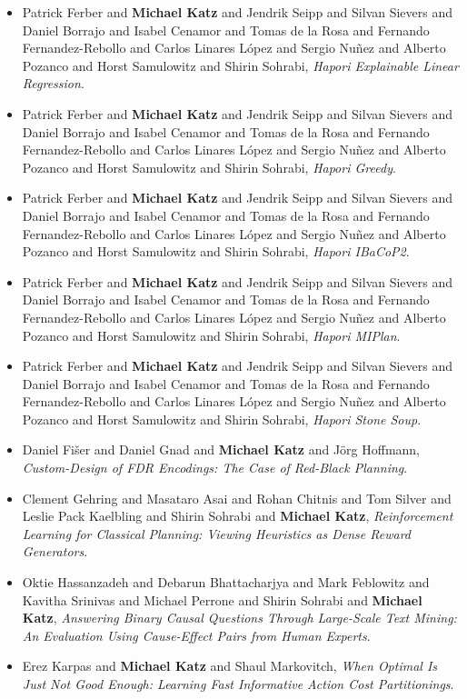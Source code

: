 \begin{itemize}[noitemsep]
\item Patrick Ferber and {\bf Michael Katz} and Jendrik Seipp and Silvan Sievers and Daniel Borrajo and Isabel Cenamor and Tomas de la Rosa and Fernando Fernandez-Rebollo and Carlos Linares López and Sergio Nuñez and Alberto Pozanco and Horst Samulowitz and Shirin Sohrabi, {\it Hapori Explainable Linear Regression}.
\item Patrick Ferber and {\bf Michael Katz} and Jendrik Seipp and Silvan Sievers and Daniel Borrajo and Isabel Cenamor and Tomas de la Rosa and Fernando Fernandez-Rebollo and Carlos Linares López and Sergio Nuñez and Alberto Pozanco and Horst Samulowitz and Shirin Sohrabi, {\it Hapori Greedy}.
\item Patrick Ferber and {\bf Michael Katz} and Jendrik Seipp and Silvan Sievers and Daniel Borrajo and Isabel Cenamor and Tomas de la Rosa and Fernando Fernandez-Rebollo and Carlos Linares López and Sergio Nuñez and Alberto Pozanco and Horst Samulowitz and Shirin Sohrabi, {\it Hapori IBaCoP2}.
\item Patrick Ferber and {\bf Michael Katz} and Jendrik Seipp and Silvan Sievers and Daniel Borrajo and Isabel Cenamor and Tomas de la Rosa and Fernando Fernandez-Rebollo and Carlos Linares López and Sergio Nuñez and Alberto Pozanco and Horst Samulowitz and Shirin Sohrabi, {\it Hapori MIPlan}.
\item Patrick Ferber and {\bf Michael Katz} and Jendrik Seipp and Silvan Sievers and Daniel Borrajo and Isabel Cenamor and Tomas de la Rosa and Fernando Fernandez-Rebollo and Carlos Linares López and Sergio Nuñez and Alberto Pozanco and Horst Samulowitz and Shirin Sohrabi, {\it Hapori Stone Soup}.
\item Daniel Fišer and Daniel Gnad and {\bf Michael Katz} and Jörg Hoffmann, {\it Custom-Design of FDR Encodings: The Case of Red-Black Planning}.
\item Clement Gehring and Masataro Asai and Rohan Chitnis and Tom Silver and Leslie Pack Kaelbling and Shirin Sohrabi and {\bf Michael Katz}, {\it Reinforcement Learning for Classical Planning: Viewing Heuristics as Dense Reward Generators}.
\item Oktie Hassanzadeh and Debarun Bhattacharjya and Mark Feblowitz and Kavitha Srinivas and Michael Perrone and Shirin Sohrabi and {\bf Michael Katz}, {\it Answering Binary Causal Questions Through Large-Scale Text Mining: An Evaluation Using Cause-Effect Pairs from Human Experts}.
\item Erez Karpas and {\bf Michael Katz} and Shaul Markovitch, {\it When Optimal Is Just Not Good Enough: Learning Fast Informative Action Cost Partitionings}.

\end{itemize}
